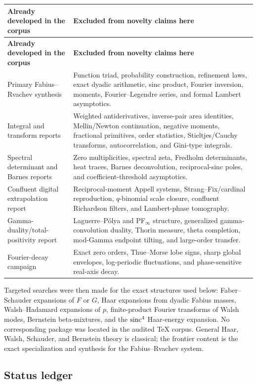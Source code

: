 \documentclass[11pt]{article}
\theoremstyle{definition}
\theoremstyle{remark}
\begin{document}
\begin{longtable}{@{}p{}p{}@{}}
\toprule
\textbf{Already developed in the corpus} & \textbf{Excluded from novelty claims here}\\
\midrule
\endfirsthead
\toprule
\textbf{Already developed in the corpus} & \textbf{Excluded from novelty claims here}\\
\midrule
\endhead
Primary Fabius--Rvachev synthesis & Function triad, probability construction,
refinement laws, exact dyadic arithmetic, sinc product, Fourier inversion,
moments, Fourier--Legendre series, and formal Lambert asymptotics.\\
Integral and transform reports & Weighted antiderivatives, inverse-pair area
identities, Mellin/Newton continuation, negative moments, fractional primitives,
order statistics, Stieltjes/Cauchy transforms, autocorrelation, and Gini-type
integrals.\\
Spectral determinant and Barnes reports & Zero multiplicities, spectral zeta,
Fredholm determinants, heat traces, Barnes deconvolution, reciprocal-sinc poles,
and coefficient-threshold asymptotics.\\
Confluent digital extrapolation report & Reciprocal-moment Appell systems,
Strang--Fix/cardinal reproduction, $q$-binomial scale closure, confluent
Richardson filters, and Lambert-phase tomography.\\
Gamma-duality/total-positivity report & Laguerre--P\'olya and PF$_\infty$
structure, generalized gamma-convolution duality, Thorin measure, theta
completion, mod-Gamma endpoint tilting, and large-order transfer.\\
Fourier-decay campaign & Exact zero orders, Thue--Morse lobe signs, sharp global
envelopes, log-periodic fluctuations, and phase-sensitive real-axis decay.\\
\bottomrule
\end{longtable}

Targeted searches were then made for the exact structures used below:
Faber--Schauder expansions of $F$ or $G$, Haar expansions from dyadic Fabius
masses, Walsh--Hadamard expansions of $p$, finite-product Fourier transforms of
Walsh modes, Bernstein beta-mixtures, and the $\operatorname{sinc}^4$ Haar-energy expansion.
No corresponding package was located in the audited TeX corpus.  General Haar,
Walsh, Schauder, and Bernstein theory is classical; the frontier content is the
exact specialization and synthesis for the Fabius--Rvachev system.

\subsection{Status ledger}
\end{document}
